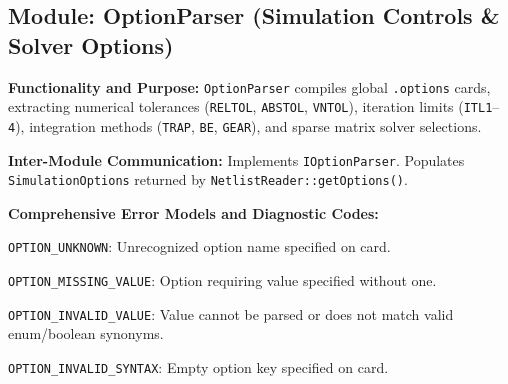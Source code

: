 \subsection{Module: OptionParser (Simulation Controls \& Solver Options)}

\textbf{Functionality and Purpose:} \texttt{OptionParser} compiles global \texttt{.options} cards, extracting numerical tolerances (\texttt{RELTOL}, \texttt{ABSTOL}, \texttt{VNTOL}), iteration limits (\texttt{ITL1}--\texttt{4}), integration methods (\texttt{TRAP}, \texttt{BE}, \texttt{GEAR}), and sparse matrix solver selections.

\textbf{Inter-Module Communication:} Implements \texttt{IOptionParser}. Populates \texttt{SimulationOptions} returned by \texttt{NetlistReader::getOptions()}.

\textbf{Comprehensive Error Models and Diagnostic Codes:}
\begin{compactitem}
    \item \texttt{OPTION\_UNKNOWN}: Unrecognized option name specified on card.
    \item \texttt{OPTION\_MISSING\_VALUE}: Option requiring value specified without one.
    \item \texttt{OPTION\_INVALID\_VALUE}: Value cannot be parsed or does not match valid enum/boolean synonyms.
    \item \texttt{OPTION\_INVALID\_SYNTAX}: Empty option key specified on card.
\end{compactitem}

